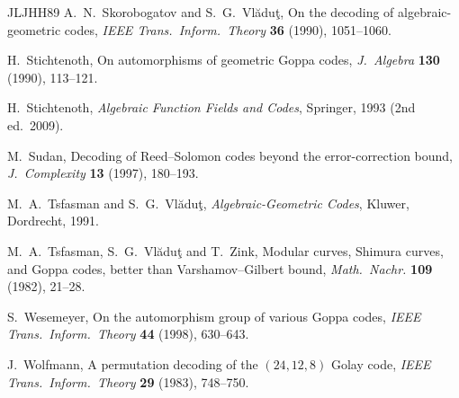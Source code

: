 \documentclass[12pt,letterpaper]{article}
\theoremstyle{definition}
\theoremstyle{remark}
\numberwithin{equation}{section}
\begin{document}
\begin{thebibliography}{JLJHH89}
 A.~N.~Skorobogatov and S.~G.~Vl\u{a}du\c{t}, On
the decoding of algebraic-geometric codes, \emph{IEEE Trans.\ Inform.\
Theory} \textbf{36} (1990), 1051--1060.

 H.~Stichtenoth, On automorphisms of geometric Goppa
codes, \emph{J.\ Algebra} \textbf{130} (1990), 113--121.

 H.~Stichtenoth, \emph{Algebraic Function Fields and
Codes}, Springer, 1993 (2nd ed.\ 2009).

 M.~Sudan, Decoding of Reed--Solomon codes beyond
the error-correction bound, \emph{J.\ Complexity} \textbf{13} (1997),
180--193.

 M.~A.~Tsfasman and S.~G.~Vl\u{a}du\c{t},
\emph{Algebraic-Geometric Codes}, Kluwer, Dordrecht, 1991.

 M.~A.~Tsfasman, S.~G.~Vl\u{a}du\c{t} and
T.~Zink, Modular curves, Shimura curves, and Goppa codes, better than
Varshamov--Gilbert bound, \emph{Math.\ Nachr.} \textbf{109} (1982),
21--28.

 S.~Wesemeyer, On the automorphism group of various Goppa
codes, \emph{IEEE Trans.\ Inform.\ Theory} \textbf{44} (1998), 630--643.

 J.~Wolfmann, A permutation decoding of the
$(24,12,8)$ Golay code, \emph{IEEE Trans.\ Inform.\ Theory} \textbf{29}
(1983), 748--750.

\end{thebibliography}
\end{document}

